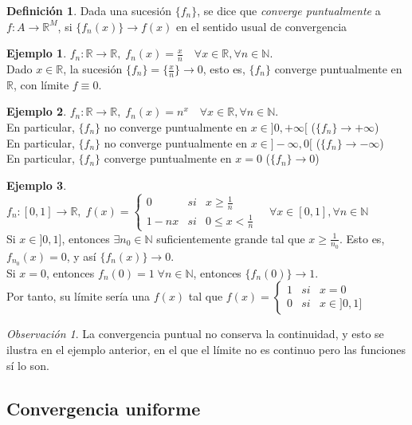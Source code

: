 \documentclass[11pt,twoside,titlepage,a4paper]{article}
\theoremstyle{plain}
\theoremstyle{definition}
\newtheorem{defi}{Definición}[section]
\newtheorem{ej}{Ejemplo}[section]
\theoremstyle{remark}
\newtheorem*{obs}{Observación}
\begin{document}
\begin{defi}
	Dada una sucesión $\{f_n\}$, se dice que \textit{converge puntualmente} a $f:A\to\mathbb{R}^M$,
	si $\{f_n(x)\}\to f(x)$ en el sentido usual de convergencia
\end{defi}
\begin{ej}
	$f_n:\mathbb{R}\to\mathbb{R},\; f_n(x)=\frac xn\quad\forall x\in\mathbb{R},\forall n\in\mathbb{N}$.
	\\Dado $x\in\mathbb{R}$, la sucesión $\{f_n\}=\{\frac xn\}\to 0$, esto es, $\{f_n\}$ converge
	puntualmente en $\mathbb{R}$, con límite $f\equiv 0$.
\end{ej}
\begin{ej}
	$f_n:\mathbb{R}\to\mathbb{R},\; f_n(x)=n^x\quad\forall x\in\mathbb{R},\forall n\in\mathbb{N}$.
	\\En particular, $\{f_n\}$ no converge puntualmente en $x\in]0,+\infty[$ \quad($\{f_n\}\to+\infty$)
	\\En particular, $\{f_n\}$ no converge puntualmente en $x\in]-\infty,0[$ \quad($\{f_n\}\to-\infty$)
	\\En particular, $\{f_n\}$ converge puntualmente en $x=0$ \quad($\{f_n\}\to 0$)
\end{ej}
\begin{ej}
	$f_n:[0,1]\to\mathbb{R},\; 
	f(x)= \left\{\begin{array}{lcc}
		0 & si & x \geq \frac 1n \\
		1-nx & si & 0\leq x < \frac 1n
	\end{array}\right.\quad\forall x\in[0,1],\forall n\in\mathbb{N}$
	\\Si $x\in]0,1]$, entonces $\exists n_0\in\mathbb{N}$ suficientemente grande tal que 
	$x\geq\frac{1}{n_0}$. Esto es, $f_{n_0}(x)=0$, y así $\{f_n(x)\}\to 0$.
	\\Si $x=0$, entonces $f_n(0)=1\;\forall n\in\mathbb{N}$, entonces $\{f_n(0)\}\to 1$.
	\\Por tanto, su límite sería una $f(x)$ tal que $f(x)=\left\{\begin{array}{lcc}
		1 & si & x=0 \\
		0 & si & x\in]0,1]
	\end{array}\right.$
\end{ej}
\begin{obs}
	La convergencia puntual no conserva la continuidad, y esto se ilustra en el ejemplo anterior,
	en el que el límite no es continuo pero las funciones sí lo son.
\end{obs}

\subsection{Convergencia uniforme}
\end{document}
